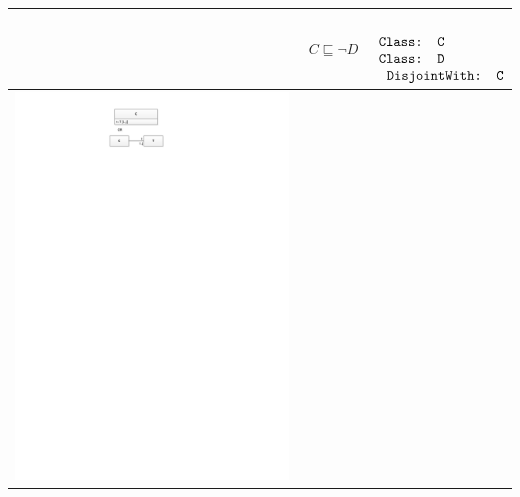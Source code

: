 \documentclass[11pt,final,onecolumn]{report}
\newcommand\umltablespacing{3cm}
\newcommand\dltablespacing{4.5cm}
\newcommand\owlspacing{-1mm}
\begin{document}
\begin{longtable}{|>{\scriptsize}c|>{\scriptsize}l|>{\scriptsize}l|}
\begin{minipage}{\umltablespacing}
    \end{minipage}
    &
    \begin{minipage}{\dltablespacing}
       $\begin{aligned}   
	  C \sqsubseteq \neg D
       \end{aligned}$       
    \end{minipage}
    &
      $\begin{aligned}
	  &\texttt{}\\
	  &\texttt{Class: C}\\[\owlspacing]
	  &\texttt{Class: D}\\[\owlspacing]
	  &\texttt{\hspace*{0.2cm}DisjointWith: C}
     \end{aligned}$
    \\\hline
    \begin{minipage}{\umltablespacing}    
      \centering\includegraphics[trim = 72mm 250mm 92mm 4mm, clip, scale=0.75]{./diagrams/chapter5/Attribute} 

\end{minipage}
\end{longtable}
\end{document}
